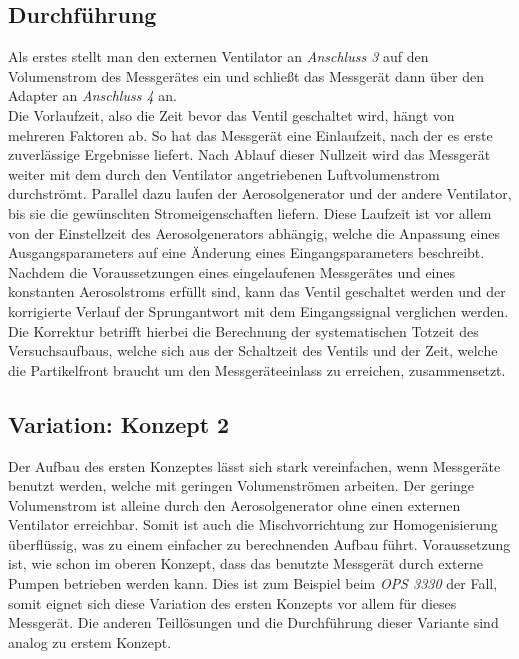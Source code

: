 \subsection{Durchf\"{u}hrung}
Als erstes stellt man den externen Ventilator an \textit{Anschluss 3} auf den Volumenstrom des Messger\"{a}tes ein und schlie{\ss}t das Messger\"{a}t dann \"{u}ber den Adapter an \textit{Anschluss 4} an.\\
Die Vorlaufzeit, also die Zeit bevor das Ventil geschaltet wird, h\"{a}ngt von mehreren Faktoren ab. So hat das Messger\"{a}t eine Einlaufzeit, nach der es erste zuverl\"{a}ssige Ergebnisse liefert. Nach Ablauf dieser Nullzeit wird das Messger\"{a}t weiter mit dem durch den Ventilator angetriebenen Luftvolumenstrom durchstr\"{o}mt. Parallel dazu laufen der Aerosolgenerator und der andere Ventilator, bis sie die gew\"{u}nschten Stromeigenschaften liefern. Diese Laufzeit ist vor allem von der Einstellzeit des Aerosolgenerators abh\"{a}ngig, welche die Anpassung eines Ausgangsparameters auf eine \"{A}nderung eines Eingangsparameters beschreibt. Nachdem die Voraussetzungen eines eingelaufenen Messger\"{a}tes und eines konstanten Aerosolstroms erf\"{u}llt sind, kann das Ventil geschaltet werden und der korrigierte Verlauf der Sprungantwort mit dem Eingangssignal verglichen werden. Die Korrektur betrifft hierbei die Berechnung der systematischen Totzeit des Versuchsaufbaus, welche sich aus der Schaltzeit des Ventils und der Zeit, welche die Partikelfront braucht um den Messger\"{a}teeinlass zu erreichen, zusammensetzt.

\subsection{Variation: Konzept 2}
Der Aufbau des ersten Konzeptes l\"{a}sst sich stark vereinfachen, wenn Messger\"{a}te benutzt werden, welche mit geringen Volumenstr\"{o}men arbeiten. Der geringe Volumenstrom ist alleine durch den Aerosolgenerator ohne einen externen Ventilator erreichbar. Somit ist auch die Mischvorrichtung zur Homogenisierung \"{u}berfl\"{u}ssig, was zu einem einfacher zu berechnenden Aufbau f\"{u}hrt. Voraussetzung ist, wie schon im oberen Konzept, dass das benutzte Messger\"{a}t durch externe Pumpen betrieben werden kann. Dies ist zum Beispiel beim \textit{OPS 3330} der Fall, somit eignet sich diese Variation des ersten Konzepts vor allem f\"{u}r dieses Messger\"{a}t. Die anderen Teill\"{o}sungen und die Durchf\"{u}hrung dieser Variante sind analog zu erstem Konzept.

